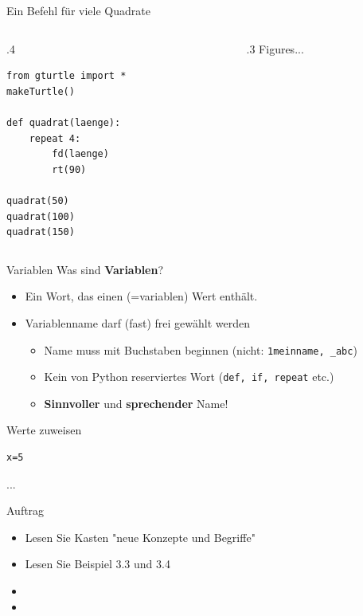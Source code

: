 \begin{frame}[fragile]{Ein Befehl für viele Quadrate}
\begin{columns}
\begin{column}{.4\pagewidth}
\begin{lstlisting}[style=TigerJython, basicstyle=\scriptsize\ttfamily]
from gturtle import *
makeTurtle()

def quadrat(laenge):
	repeat 4:
		fd(laenge)
		rt(90)
		
quadrat(50)
quadrat(100)
quadrat(150)
\end{lstlisting}
\end{column}
\begin{column}{.3\pagewidth}
Figures...
\end{column}
\end{columns}
\end{frame}
\begin{frame}[fragile]{Variablen}
Was sind \textbf{Variablen}?
\begin{itemize}[<+->]
\item Ein Wort, das einen  (=variablen) Wert enthält.
\item Variablenname darf (fast) frei gewählt werden
\begin{itemize}
\item Name muss mit Buchstaben beginnen (nicht: \verb|1meinname, _abc|)
\item Kein von Python reserviertes Wort (\lstinline[style=TigerJython]|def, if, repeat| etc.)
\item \textbf{Sinnvoller} und \textbf{sprechender} Name!
\end{itemize}
\end{itemize}
\end{frame}

\begin{frame}[fragile]{Werte zuweisen}
\begin{lstlisting}[style=TigerJython]
x=5
\end{lstlisting}
...
\end{frame}

\begin{frame}[fragile]{Auftrag}
\begin{itemize}
\item Lesen Sie Kasten "neue Konzepte und Begriffe"
\item Lesen Sie Beispiel 3.3 und 3.4
\item {}
\item {}
\end{itemize}

\end{frame}